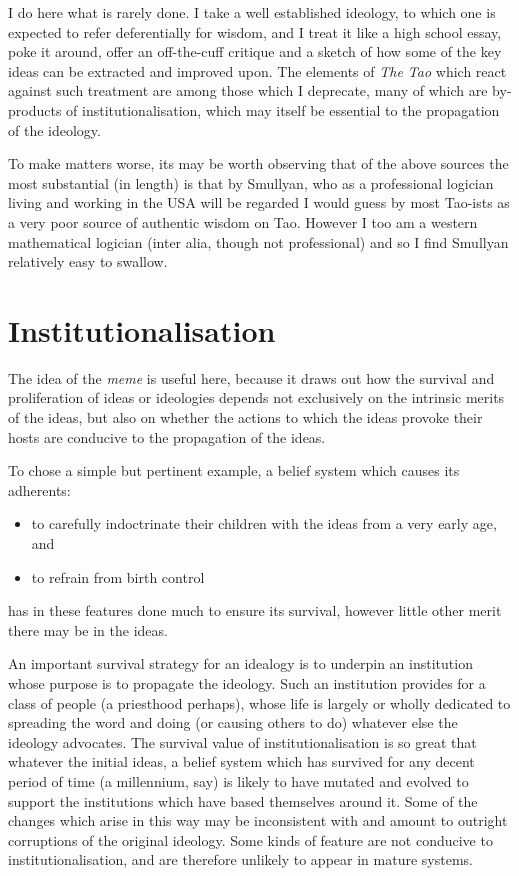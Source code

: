 \documentclass[numreferences]{rbjk}
\begin{document}
\begin{article}
I do here what is rarely done.
I take a well established ideology, to which one is expected to refer deferentially for wisdom, and I treat it like a high school essay, poke it around, offer an off-the-cuff critique and a sketch of how some of the key ideas can be extracted and improved upon.
The elements of {\it The Tao} which react against such treatment are among those which I deprecate, many of which are by-products of institutionalisation, which may itself be essential to the propagation of the ideology.

To make matters worse, its may be worth observing that of the above sources the most substantial (in length) is that by  Smullyan, who as a professional logician living and working in the USA will be regarded I would guess by most Tao-ists as a very poor source of authentic wisdom on Tao.
However I too am a western mathematical logician (inter alia, though not professional) and so I find Smullyan relatively easy to swallow.

\section{Institutionalisation}

The idea of the {\it meme} is useful here, because it draws out how the survival and proliferation of ideas or ideologies depends not exclusively on the intrinsic merits of the ideas, but also on whether the actions to which the ideas provoke their hosts are conducive to the propagation of the ideas.

To chose a simple but pertinent example, a belief system which causes its adherents:
\begin{itemize}
\item to carefully indoctrinate their children with the ideas from a very early age, and
\item to refrain from birth control
\end{itemize}
has in these features done much to ensure its survival, however little other merit there may be in the ideas.

An important survival strategy for an idealogy is to underpin an institution whose purpose is to propagate the ideology.
Such an institution provides for a class of people (a priesthood perhaps), whose life is largely or wholly dedicated to spreading the word and doing (or causing others to do) whatever else the ideology advocates.
The survival value of institutionalisation is so great that whatever the initial ideas, a belief system which has survived for any decent period of time (a millennium, say) is likely to have mutated and evolved to support the institutions which have based themselves around it. 
Some of the changes which arise in this way may be inconsistent with and amount to outright corruptions of the original ideology.
Some kinds of feature are not conducive to institutionalisation, and are therefore unlikely to appear in mature systems.


\end{article}
\end{document}
